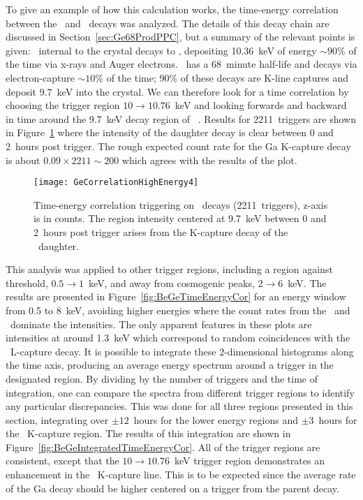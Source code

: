 	To give an example of how this calculation works, the time-energy correlation between the \gersixeight~and \galsixeight~decays was analyzed.  The details of this decay chain are discussed in Section~\ref{sec:Ge68ProdPPC}, but a summary of the relevant points is given:  \gersixeight~internal to the crystal decays to \galsixeight, depositing 10.36~keV of energy $\sim90\%$ of the time via x-rays and Auger electrons.  \galsixeight~has a 68~minute half-life and decays via electron-capture $\sim10$\% of the time; 90\% of these decays are K-line captures and deposit 9.7~keV into the crystal.  We can therefore look for a time correlation by choosing the trigger region $10\to10.76$~keV and looking forwards and backward in time around the 9.7~keV decay region of \galsixeight~\cite{Schonfeld1994955}.  Results for 2211~triggers are shown in Figure~\ref{fig:BeGeGeCorrelation} where the intensity of the daughter decay is clear between 0 and 2~hours post trigger.  The rough expected count rate for the Ga K-capture decay is about $0.09\times2211 \sim 200$ which agrees with the results of the plot.  
	

			\begin{figure}
				\centering
				\texttt{[image: GeCorrelationHighEnergy4]}
				\caption[Time-energy correlation triggering on \gersixeight~decays.]
				{Time-energy correlation triggering on \gersixeight~decays (2211~triggers), z-axis is in counts.  The region intensity centered at 9.7~keV between 0 and 2~hours post trigger arises from the K-capture decay of the 
				\galsixeight~daughter.}
				\label{fig:BeGeGeCorrelation}
			\end{figure}	

	This analysis was applied to other trigger regions, including a region against threshold, $0.5\to1$~keV, and away from cosmogenic peaks, $2\to6$~keV.  The results are presented in Figure~\ref{fig:BeGeTimeEnergyCor} for an energy window from 0.5 to 8~keV, avoiding higher energies where the count rates from the \znsixfive~and \gersixeight~dominate the intensities.  The only apparent features in these plots are intensities at around 1.3~keV which correspond to random coincidences with the \gersixeight~L-capture decay.  It is possible to integrate these 2-dimensional histograms along the time axis, producing an average energy spectrum around a trigger in the designated region.  By dividing by the number of triggers and the time of integration, one can compare the spectra from different trigger regions to identify any particular discrepancies.  This was done for all three regions presented in this section, integrating over $\pm12$~hours for the lower energy regions and $\pm3$~hours for the \gersixeight~K-capture region.  The results of this integration are shown in Figure~\ref{fig:BeGeIntegratedTimeEnergyCor}.  All of the trigger regions are consistent, except that the $10\to10.76$~keV trigger region demonstrates an enhancement in the \galsixeight~K-capture line.  This is to be expected since the average rate of the Ga decay should be higher centered on a trigger from the parent decay.


